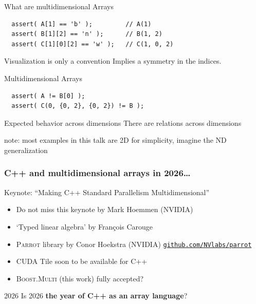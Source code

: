 \documentclass[t,aspectratio=169,handout]{beamer}
\begin{document}
{
  \usebackgroundtemplate{
    
  }
\begin{frame}[label=intro1,fragile]{What are multidimensional Arrays}
\vspace{3cm}
\begin{lstlisting}
  assert( A[1] == 'b' );         // A(1)
  assert( B[1][2] == 'n' );      // B(1, 2)
  assert( C[1][0][2] == 'w' );   // C(1, 0, 2)
\end{lstlisting}
\begin{alertblock}{Visualization is only a convention}
  Implies a symmetry in the indices.
\end{alertblock}
\end{frame}

\begin{frame}[fragile]{Multidimensional Arrays}
\vspace{3cm}
\begin{lstlisting}
  assert( A != B[0] );
  assert( C(0, {0, 2}, {0, 2}) != B );
\end{lstlisting}
\begin{alertblock}{Expected behavior across dimensions}
  There are relations across dimensions
\end{alertblock}
note: most examples in this talk are 2D for simplicity, imagine the ND generalization
\end{frame}
}

\begin{frame}
\frametitle{C++ and multidimensional arrays in 2026\ldots}

\begin{block}{Keynote: ``Making C++ Standard Parallelism Multidimensional''}
  \begin{itemize}
    \item Do not miss this keynote by Mark Hoemmen (NVIDIA)
  \end{itemize}
\end{block}
\begin{itemize}
  \item `Typed linear algebra' by François Carouge
  \item \textsc{Parrot} library by Conor Hoekstra (NVIDIA) \href{https://github.com/NVlabs/parrot}{\texttt{github.com/NVlabs/parrot}}
  \item CUDA Tile soon to be available for C++
  \item \textsc{Boost.Multi} (this work) fully accepted? 
\end{itemize}

\bigskip
\begin{alertblock}{2026}
  \large Is 2026 \textbf{the year of C++ as an array language}? 
\end{alertblock}

\end{frame}
\end{document}
